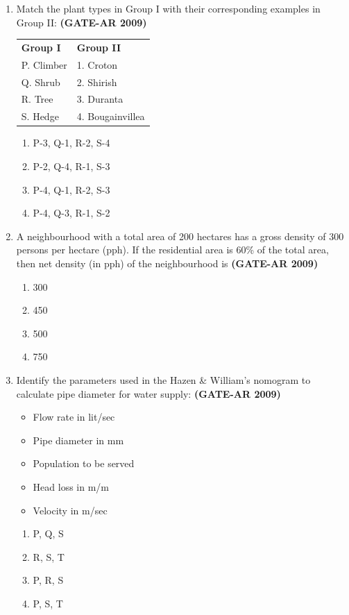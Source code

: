\documentclass[a4paper,10pt]{article}
\begin{document}
\begin{enumerate}
	\item Match the plant types in Group I with their corresponding examples in Group II: \hfill \textbf{(GATE-AR 2009)} \\
    \begin{tabular}{ l l }
	\textbf{Group I} & \textbf{Group II} \\
	P. Climber & 1. Croton \\
	Q. Shrub & 2. Shirish \\
	R. Tree & 3. Duranta \\
	S. Hedge & 4. Bougainvillea \\
	\end{tabular}
	\begin{multicols}{2}
	\begin{enumerate}
        \item P-3, Q-1, R-2, S-4
        \item P-2, Q-4, R-1, S-3
        \item P-4, Q-1, R-2, S-3
        \item P-4, Q-3, R-1, S-2
    \end{enumerate}
	\end{multicols}

    \item A neighbourhood with a total area of 200 hectares has a gross density of 300 persons per hectare (pph). If the residential area is 60\% of the total area, then net density (in pph) of the neighbourhood is \hfill \textbf{(GATE-AR 2009)}
    \begin{multicols}{4}
	\begin{enumerate}
        \item 300
        \item 450
        \item 500
        \item 750
    \end{enumerate}
	\end{multicols}

    \item Identify the parameters used in the Hazen \& William’s nomogram to calculate pipe diameter for water supply: \hfill \textbf{(GATE-AR 2009)}
    \begin{itemize}
        \item Flow rate in lit/sec
        \item Pipe diameter in mm
        \item Population to be served
        \item Head loss in m/m
        \item Velocity in m/sec
    \end{itemize}
    \begin{multicols}{4}
	\begin{enumerate}
        \item P, Q, S
        \item R, S, T
        \item P, R, S
        \item P, S, T
    \end{enumerate}
	\end{multicols}


\end{enumerate}
\end{document}
